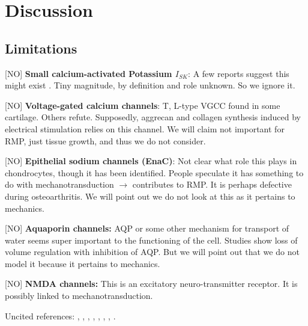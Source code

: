 \section*{Discussion}
\label{sec:discussion}



\subsection*{Limitations}
\label{sec:limitations}

[NO] {\bf Small calcium-activated Potassium $I_{SK}$}: A few reports
suggest this might exist \citep{Halletal1996,
  BarrettJolleyetal2010}. Tiny magnitude, by definition and role
unknown. So we ignore it.

[NO] {\bf Voltage-gated calcium channels}: T, L-type VGCC found in
some cartilage. Others refute. Supposedly, aggrecan and collagen
synthesis induced by electrical stimulation relies on this channel. We
will claim not important for RMP, just tissue growth, and thus we do
not consider.

[NO] {\bf Epithelial sodium channels (EnaC)}: Not clear what role this
plays in chondrocytes, though it has been identified. People speculate
it has something to do with mechanotransduction $\rightarrow$
contributes to RMP. It is perhaps defective during osteoarthritis. We
will point out we do not look at this as it pertains to mechanics.

[NO] {\bf Aquaporin channels:} AQP or some other mechanism for
transport of water seems super important to the functioning of the
cell. Studies show loss of volume regulation with inhibition of
AQP. But we will point out that we do not model it because it pertains
to mechanics.

[NO] {\bf NMDA channels:} This is an excitatory neuro-transmitter
receptor. It is possibly linked to mechanotransduction.


Uncited references:
\cite{ArcherWest2003},
\cite{Grishkoetal2010},
\cite{Hille2001},
\cite{LesageLazdunski2000},
\cite{MillwardSadleretal2000},
\cite{Nygrenetal1998},
\cite{Scholz2002},
\cite{Tsugaetal2001}.

